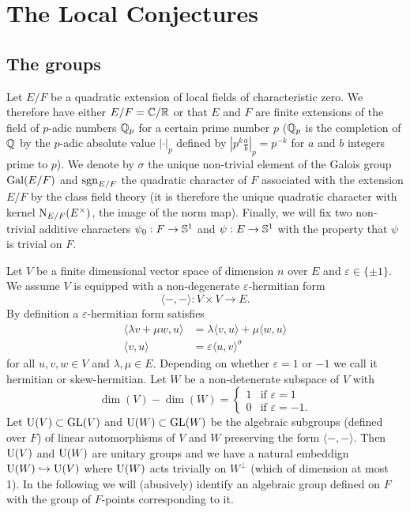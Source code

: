 \section{The Local Conjectures}

\subsection{The groups}

Let $E/F$ be a quadratic extension of local fields of characteristic zero.
We therefore have either $E/F = \mathbb{C} / \mathbb{R}$ or that $E$ and $F$ are finite extensions of the field of $p$-adic numbers $\mathbb{Q}_p$ for a certain prime number $p$ ($\mathbb{Q}_p$ is the completion of $\mathbb{Q}$ by the $p$-adic absolute value $|\cdot|_p$ defined by $|p^k \frac{a}{b}|
_p = p^{-k}$ for $a$ and $b$ integers prime to $p$).
We denote by $\sigma$  the unique non-trivial element of the Galois
group $\mathrm{Gal}(E/F)$ and $\mathrm{sgn}_{E/F}$ the quadratic character of $F$ associated with the extension $E/F$ by the class field theory (it is therefore the unique quadratic character with kernel $\mathrm{N}_{E/F}(E^\times)$, the image of the norm map).
Finally, we will fix two non-trivial additive characters $\psi_0: F \to \mathbb{S}^1$ and $\psi: E \to \mathbb{S}^1$ with the property that $\psi$ is trivial on $F$.

Let $V$ be a finite dimensional vector space of dimension $n$ over $E$ and $\varepsilon \in \{ \pm 1 \}$.
We assume $V$ is equipped with a non-degenerate $\varepsilon$-hermitian form
\[
    \langle -, -\rangle: V \times V \to E.
\]
By definition a $\varepsilon$-hermitian form satisfies
\begin{align*}
    \langle \lambda v + \mu w, u \rangle &= \lambda \langle v, u \rangle + \mu \langle w, u \rangle \\
    \langle v, u \rangle &= \varepsilon \langle u, v \rangle^\sigma
\end{align*}
for all $u, v, w \in V$ and $\lambda, \mu \in E$.
Depending on whether $\varepsilon = 1$ or $-1$ we call it hermitian or skew-hermitian.
Let $W$ be a non-detenerate subspace of $V$ with
\[
    \dim(V) - \dim(W) = \begin{cases} 1 &\text{if }\varepsilon = 1 \\ 0 & \text{if } \varepsilon = -1. \end{cases}
\]
Let $\mathrm{U}(V) \subset \mathrm{GL}(V)$ and $\mathrm{U}(W) \subset \mathrm{GL}(W)$ be the algebraic subgroups (defined over $F$) of linear automorphisms of $V$ and $W$ preserving the form $\langle -, - \rangle$.
Then $\mathrm{U}(V)$ and $\mathrm{U}(W)$ are unitary groups and we have a natural embeddign $\mathrm{U}(W) \hookrightarrow \mathrm{U}(V)$ where $\mathrm{U}(W)$ acts trivially on $W^\perp$ (which of dimension at most 1).
In the following we will (abusively) identify an algebraic group defined on $F$ with the group of $F$-points corresponding to it.

